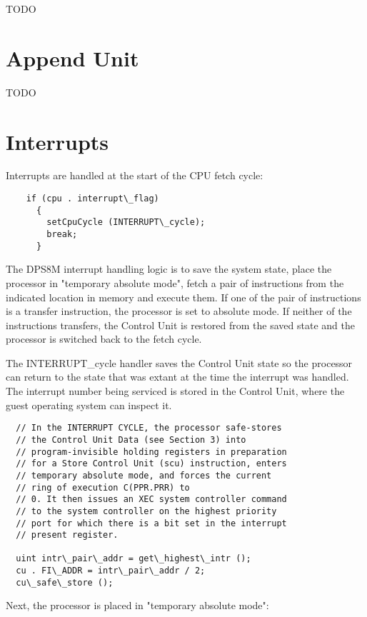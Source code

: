 \documentclass[notitlepage]{report}
\begin{document}
TODO

\section{Append Unit}

TODO

\section{Interrupts}

Interrupts are handled at the start of the CPU fetch cycle:

\begin{verbatim}
    if (cpu . interrupt\_flag)
      {
        setCpuCycle (INTERRUPT\_cycle);
        break;
      }
\end{verbatim}

The DPS8M interrupt handling logic is to save the system state, place the processor in "temporary absolute 
mode", fetch a pair of instructions from the indicated location in memory and execute them. If one
of the pair of instructions is a transfer instruction, the processor is set to absolute mode. If
neither of the instructions transfers, the Control Unit is restored from the saved state and the
processor is switched back to the fetch cycle.

The INTERRUPT\_cycle handler saves the Control Unit state so the processor can return to the
state that was extant at the time the interrupt was handled. The interrupt number being serviced
is stored in the Control Unit, where the guest operating system can inspect it.

\begin{verbatim}
  // In the INTERRUPT CYCLE, the processor safe-stores
  // the Control Unit Data (see Section 3) into 
  // program-invisible holding registers in preparation 
  // for a Store Control Unit (scu) instruction, enters 
  // temporary absolute mode, and forces the current 
  // ring of execution C(PPR.PRR) to
  // 0. It then issues an XEC system controller command 
  // to the system controller on the highest priority 
  // port for which there is a bit set in the interrupt 
  // present register.  

  uint intr\_pair\_addr = get\_highest\_intr ();
  cu . FI\_ADDR = intr\_pair\_addr / 2;
  cu\_safe\_store ();
\end{verbatim}

Next, the processor is placed in  "temporary absolute mode":
\end{document}
